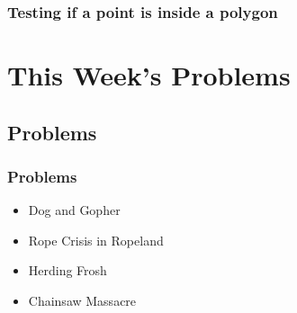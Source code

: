\documentclass{beamer}
\begin{document}
\begin{frame}
  \frametitle{Testing if a point is inside a polygon}
\end{frame}

\section{This Week's Problems}

\subsection{Problems}
\begin{frame}
  \frametitle{Problems}
  \begin{itemize}
  \item Dog and Gopher
  \item Rope Crisis in Ropeland
  \item Herding Frosh
  \item Chainsaw Massacre
  \end{itemize}
\end{frame}
\end{document}
